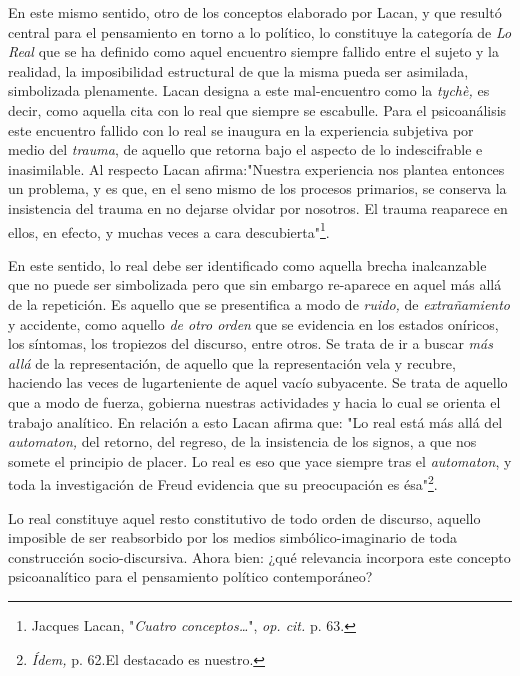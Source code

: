 En este mismo sentido, otro de los conceptos elaborado por Lacan, y que
resultó central para el pensamiento en torno a lo político, lo
constituye la categoría de \emph{Lo Real} que se ha definido como aquel
encuentro siempre fallido entre el sujeto y la realidad, la
imposibilidad estructural de que la misma pueda ser asimilada,
simbolizada plenamente. Lacan designa a este mal-encuentro como la
\emph{tychè,} es decir, como aquella cita con lo real que siempre se
escabulle. Para el psicoanálisis este encuentro fallido con lo real se
inaugura en la experiencia subjetiva por medio del \emph{trauma}, de
aquello que retorna bajo el aspecto de lo indescifrable e inasimilable.
Al respecto Lacan afirma:"Nuestra experiencia nos plantea entonces un
problema, y es que, en el seno mismo de los procesos primarios, se
conserva la insistencia del trauma en no dejarse olvidar por nosotros.
El trauma reaparece en ellos, en efecto, y muchas veces a cara
descubierta"\footnote{Jacques Lacan, "\emph{Cuatro conceptos\ldots{}}",
  \emph{op. cit.} p. 63.}.

En este sentido, lo real debe ser identificado como aquella brecha
inalcanzable que no puede ser simbolizada pero que sin embargo
re-aparece en aquel más allá de la repetición. Es aquello que se
presentifica a modo de \emph{ruido,} de \emph{extrañamiento} y
accidente, como aquello \emph{de otro orden} que se evidencia en los
estados oníricos, los síntomas, los tropiezos del discurso, entre otros.
Se trata de ir a buscar \emph{más allá} de la representación, de aquello
que la representación vela y recubre, haciendo las veces de
lugarteniente de aquel vacío subyacente. Se trata de aquello que a modo
de fuerza, gobierna nuestras actividades y hacia lo cual se orienta el
trabajo analítico. En relación a esto Lacan afirma que: "Lo real está
más allá del \emph{automaton,} del retorno, del regreso, de la
insistencia de los signos, a que nos somete el principio de placer. Lo
real es eso que yace siempre tras el \emph{automaton}, y toda la
investigación de Freud evidencia que su preocupación es ésa"\footnote{\emph{Ídem,}
  p. 62.El destacado es nuestro.}.

Lo real constituye aquel resto constitutivo de todo orden de discurso,
aquello imposible de ser reabsorbido por los medios simbólico-imaginario
de toda construcción socio-discursiva. Ahora bien: ¿qué relevancia
incorpora este concepto psicoanalítico para el pensamiento político
contemporáneo?

